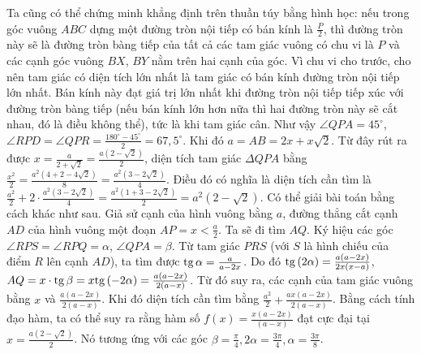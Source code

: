 \begin{multicols}{2}
	\vskip 0.1cm 
	Ta cũng có thể chứng minh khẳng định trên thuần túy bằng hình học: nếu trong góc vuông $ABC$ dựng một đường tròn nội tiếp có bán kính là $\frac{P}{2}$, thì đường tròn này sẽ là đường tròn bàng tiếp của tất cả các tam giác vuông có chu vi là $P$ và các cạnh góc vuông $BX$, $BY$ nằm trên hai cạnh của góc. Vì chu vi cho trước, cho nên tam giác có diện tích lớn nhất là tam giác có bán kính đường tròn nội tiếp lớn nhất. Bán kính này đạt giá trị lớn nhất khi đường tròn nội tiếp tiếp xúc với đường tròn bàng tiếp (nếu bán kính lớn hơn nữa thì hai đường tròn này sẽ cắt nhau, đó là điều không thể), tức là khi tam giác cân. 
	Như vậy  $\angle QPA = 45^\circ$, $\angle RPD = \angle QPR = \frac{180^\circ - 45^\circ}{2} = 67,5^\circ$. Khi đó $a = AB = 2x + x\sqrt 2 $. Từ đây rút ra được $x = \frac{a}{{2 + \sqrt 2 }} = \frac{{a\left( {2 - \sqrt 2 } \right)}}{2}$, diện tích tam giác $\Delta QPA$  bằng $\frac{{{x^2}}}{2} = \frac{{{a^2}\left( {4 + 2 - 4\sqrt 2 } \right)}}{8} = \frac{{{a^2}\left( {3 - 2\sqrt 2 } \right)}}{4}$. Điều đó có nghĩa là diện tích cần tìm là $\frac{{{a^2}}}{2} + 2 \cdot \frac{{{a^2}\left( {3 - 2\sqrt 2 } \right)}}{4} = \frac{{{a^2}\left( {1 + 3 - 2\sqrt 2 } \right)}}{2} = {a^2}\left( {2 - \sqrt 2 } \right)$.
	\vskip 0.1cm 
	Có thể giải bài toán bằng cách khác như sau. Giả sử cạnh của hình vuông bằng $a$, đường thẳng cắt cạnh $AD$ của hình vuông một đoạn  $AP = x < \frac{a}{2}$. Ta sẽ đi tìm $AQ$. Ký hiệu các góc $\angle RPS = \angle RPQ = \alpha $, $\angle QPA = \beta$. Từ tam giác $PRS$ (với $S$ là hình chiếu của điểm $R$ lên cạnh $AD$), ta tìm được ${\rm{tg}}\,\alpha  = \frac{a}{{a - 2x}}$. Do đó  ${\rm{tg}}\,(2\alpha ) = \frac{{a(a - 2x)}}{{2x(x - a)}}$,  $AQ = x \cdot {\rm{tg}}\,\beta  = x{\rm{tg}}\,( - 2\alpha ) = \frac{{a(a - 2x)}}{{2(a - x)}}$.
	\vskip 0.1cm
	Từ đó suy ra, các cạnh của tam giác vuông bằng $x$ và  $\frac{{a(a - 2x)}}{{2(a - x)}}$. Khi đó diện tích cần tìm bằng $\frac{{{a^2}}}{2} + \frac{{ax(a - 2x)}}{{2(a - x)}}$. Bằng cách tính đạo hàm, ta có thể suy ra rằng hàm số $f(x) = \frac{{x(a - 2x)}}{{(a - x)}}$  đạt cực đại tại  $x = \frac{{a(2 - \sqrt 2 )}}{2}$. Nó tương ứng với các góc  $\beta = \frac{\pi}{4}, 2\alpha = \frac{3\pi}{4}, \alpha = \frac{3\pi}{8}$.

\end{multicols}
